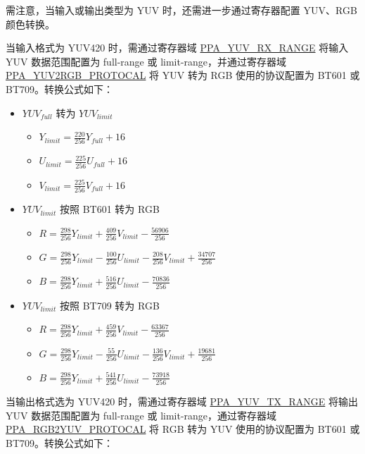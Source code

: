 \documentclass[main\_\_CN.tex]{subfiles}
\begin{document}
需注意，当输入或输出类型为 YUV 时，还需进一步通过寄存器配置 YUV、RGB 颜色转换。

当输入格式为 YUV420 时，需通过寄存器域 \hyperref[fielddesc:PPAYUVRXRANGE]{PPA\_YUV\_RX\_RANGE} 将输入 YUV 数据范围配置为 full-range 或 limit-range，并通过寄存器域 \hyperref[fielddesc:PPAYUV2RGBPROTOCAL]{PPA\_YUV2RGB\_PROTOCAL} 将 YUV 转为 RGB 使用的协议配置为 BT601 或 BT709。转换公式如下：


\begin{itemize}
    \item $YUV_{full}$ 转为 $YUV_{limit}$
        \begin{itemize}
            \item $Y_{limit} = \frac{220}{256} Y_{full} + 16$
            \item $U_{limit} = \frac{225}{256} U_{full} + 16$
            \item $V_{limit} = \frac{225}{256} V_{full} + 16$
        \end{itemize}
    \item $YUV_{limit}$ 按照 BT601 转为 RGB
        \begin{itemize}
            \item $R = \frac{298}{256}Y_{limit} + \frac{409}{256}V_{limit} - \frac{56906}{256}$
            \item $G = \frac{298}{256}Y_{limit} - \frac{100}{256}U_{limit} - \frac{208}{256}V_{limit} + \frac{34707}{256}$
            \item $B = \frac{298}{256}Y_{limit} + \frac{516}{256}U_{limit} -  \frac{70836}{256}$
        \end{itemize}
    \item $YUV_{limit}$ 按照 BT709 转为 RGB
        \begin{itemize}
            \item $R = \frac{298}{256}Y_{limit} + \frac{459}{256}V_{limit} - \frac{63367}{256}$
            \item $G = \frac{298}{256}Y_{limit} - \frac{55}{256}U_{limit} - \frac{136}{256}V_{limit} + \frac{19681}{256}$
            \item $B = \frac{298}{256}Y_{limit} + \frac{541}{256}U_{limit} -  \frac{73918}{256}$
        \end{itemize}
\end{itemize}

当输出格式选为 YUV420 时，需通过寄存器域 \hyperref[fielddesc:PPAYUVTXRANGE]{PPA\_YUV\_TX\_RANGE} 将输出 YUV 数据范围配置为 full-range 或 limit-range，通过寄存器域 \hyperref[fielddesc:PPARGB2YUVPROTOCAL]{PPA\_RGB2YUV\_PROTOCAL} 将 RGB 转为 YUV 使用的协议配置为 BT601 或 BT709。转换公式如下：
\end{document}
